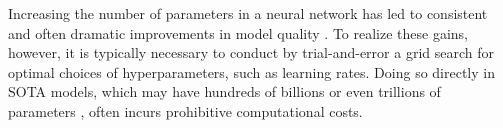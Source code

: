 \documentclass{article} %
\newcommand{\cp}[1]{\fTBD{{\textcolor{blue}[CP: #1]}}}
\begin{document}







% 
% 


Increasing the number of parameters in a neural network has led to consistent and often dramatic improvements in model quality \citep{kaplan2020scaling, hoffmann2022training, zhai2022scaling, klug2023scaling, openai2023gpt4}. To realize these gains, however, it is typically necessary to conduct by trial-and-error a grid search for optimal choices of hyperparameters, such as learning rates. Doing so directly in SOTA models, which may have hundreds of billions \citep{brown2020language} or even trillions of parameters \citep{fedus2022switch}, often incurs prohibitive computational costs.
\end{document}
